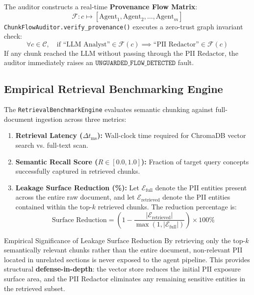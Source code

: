 \documentclass[10pt,a4paper]{article}
\begin{document}
\noindent
The auditor constructs a real-time \textbf{Provenance Flow Matrix}:
\[
\mathcal{F}: c \longmapsto [\text{Agent}_1, \text{Agent}_2, \dots, \text{Agent}_m]
\]
\texttt{ChunkFlowAuditor.verify\_provenance()} executes a zero-trust graph invariant check:
\begin{equation}
\forall c \in \mathcal{C}, \quad \text{if } \text{``LLM Analyst''} \in \mathcal{F}(c) \implies \text{``PII Redactor''} \in \mathcal{F}(c)
\end{equation}
If any chunk reached the LLM without passing through the PII Redactor, the auditor immediately raises an $\texttt{UNGUARDED\_FLOW\_DETECTED}$ fault.

\subsection{Empirical Retrieval Benchmarking Engine}
The \texttt{RetrievalBenchmarkEngine} evaluates semantic chunking against full-document ingestion across three metrics:
\begin{enumerate}
    \item \textbf{Retrieval Latency ($\Delta t_{\text{ms}}$):} Wall-clock time required for ChromaDB vector search vs. full-text scan.
    \item \textbf{Semantic Recall Score ($R \in [0.0, 1.0]$):} Fraction of target query concepts successfully captured in retrieved chunks.
    \item \textbf{Leakage Surface Reduction (\%):} Let $\mathcal{E}_{\text{full}}$ denote the PII entities present across the entire raw document, and let $\mathcal{E}_{\text{retrieved}}$ denote the PII entities contained within the top-$k$ retrieved chunks. The reduction percentage is:
    \begin{equation}
    \text{Surface Reduction} = \left( 1 - \frac{|\mathcal{E}_{\text{retrieved}}|}{\max(1, |\mathcal{E}_{\text{full}}|)} \right) \times 100\%
    \end{equation}
\end{enumerate}

\begin{calloutbox}{Empirical Significance of Leakage Surface Reduction}
By retrieving only the top-$k$ semantically relevant chunks rather than the entire document, non-relevant PII located in unrelated sections is never exposed to the agent pipeline. This provides structural \textbf{defense-in-depth}: the vector store reduces the initial PII exposure surface area, and the PII Redactor eliminates any remaining sensitive entities in the retrieved subset.
\end{calloutbox}
\end{document}
